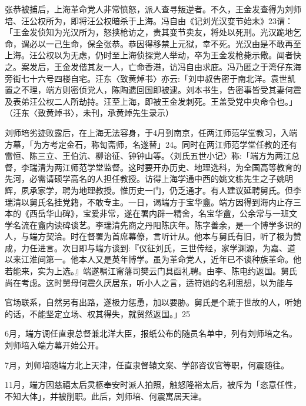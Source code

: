 张恭被捕后，上海革命党人非常愤怒，派人查寻叛逆者。不久，王金发查得为刘师培、汪公权所为，即将汪公权暗杀于上海。冯自由《记刘光汉变节始末》23谓：「王金发侦知为光汉所为，怒挟枪访之，责其变节卖友，将处以死刑。光汉跪地乞命，谓必以一己生命，保全张恭。恭因得移禁上元狱，幸不死。光汉由是不敢再至上海。汪公权以为无虑，仍时至上海侦探党人举动，卒为王金发枪毙示儆。闻者快之。案发后，王金发偕其友一人，亡命香港，访冯自由求庇。冯乃匿之于湾仔东海旁街七十六号四楼自宅。汪东〈致黄焯书〉亦云:「刘申叔告密于南北洋。袁世凯置之不理，端方则密侦党人，陈陶遗回国即被逮。刘本书生，告密事皆受其妻何震及表弟汪公权二人所劫持。汪至上海，即被王金发刺死。王盖受党中央命令也。」（汪东〈致黄焯书〉，未刊，承黄焯先生录示）

刘师培劣迹败露后，在上海无法容身，于4月到南京，任两江师范学堂教习，入端方幕，「为方考定金石，称匋斋师，名遂替」24。同时在两江师范学堂任教的还有雷恒、陈三立、王伯沆、柳诒征、钟钟山等。〈刘氏五世小记〉称:「端方为两江总督，李瑞清为两江师范学堂监督。这时要开办历史、地理选科，为全国高等教育的先河，必需请硕学高名的人担任教授。访得上海学通中西的姚文栋先生之子姚明辉，夙承家学，聘为地理教授。惟历史一门，仍乏通才。有人建议延聘舅氏。但李瑞清以舅氏名挂党籍，不敢专主。一日，谒端方于宝华盦。端方因得到海内止存三本的《西岳华山碑》，宝爱非常，遂在署内辟一精舍，名宝华盦，公余常与一班文学名流在盦内读碑谈艺。李瑞清先商之丹阳陈庆年。陈字善余，是一个博学多识的人，与端方契洽。时在督署为首席幕僚，言听计从。他本与舅氏有旧，听了极为赞成，力任进言。次日即与端方谈到:『仪征刘氏，三世传经，家学渊源，为嘉、道以来江淮间第一。他本人又是英年博学。虽为革命党人，近年已不谈种族革命。他若能来，实为上选。』端遂嘱江甯藩司樊云门具函礼聘。由李、陈电约返国。舅氏尚在考虑。这时舅母何震久厌居东，听小人之言，适符她的名利思想，以为能与

\vfill
\begin{BookNotes}
\end{BookNotes}

\noindent 官场联系，自然另有出路，遂极力惩恿，加以要胁。舅氏是个疏于世故的人，听她的话，不能坚定立场、权其得失，就贸然返国。」25

6月，端方调任直隶总督兼北洋大臣，报纸公布的随员名单中，列有刘师培之名。刘师培入端方幕开始公开。

7月，刘师培随端方北上天津，任直隶督辕文案、学部咨议官等职，何震随往。

11月，端方因慈禧太后灵柩奉安时派人拍照，触怒隆裕太后，被斥为「恣意任性，不知大体」，并被削职。此后，刘师培、何震寓居天津。

